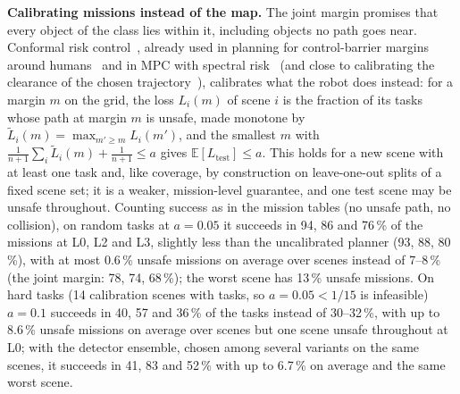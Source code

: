 \documentclass[conference]{IEEEtran}
\theoremstyle{definition}
\begin{document}
\textbf{Calibrating missions instead of the map.} The joint margin promises that every object of the class lies within
it, including objects no path goes near. Conformal risk control~\cite{crc}, already used in planning for control-barrier
margins around humans~\cite{gonzales} and in MPC with spectral risk~\cite{eom} (and close to calibrating the clearance of
the chosen trajectory~\cite{chang}), calibrates what the robot does instead: for a
margin $m$ on the grid, the loss $L_i(m)$ of scene $i$ is the fraction of its tasks whose path at margin $m$ is unsafe,
made monotone by $\tilde L_i(m) = \max_{m' \ge m} L_i(m')$, and the smallest $m$ with
$\frac{1}{n+1}\sum_i \tilde L_i(m) + \frac{1}{n+1} \le a$ gives $\mathbb E[L_{\text{test}}] \le a$. This holds for a new scene with at least one task and, like coverage, by construction on
leave-one-out splits of a fixed scene set; it is a weaker, mission-level guarantee, and one test scene may be unsafe
throughout. Counting success as in the mission tables (no unsafe path, no collision), on random tasks at $a = 0.05$ it
succeeds in 94, 86 and 76\,\% of the missions at L0, L2 and L3, slightly less than the uncalibrated planner (93, 88,
80\,\%), with at most 0.6\,\% unsafe missions on average over scenes instead of 7--8\,\% (the joint margin: 78, 74,
68\,\%); the worst scene has 13\,\% unsafe missions. On hard tasks (14 calibration scenes with tasks, so
$a = 0.05 < 1/15$ is infeasible) $a = 0.1$ succeeds in 40, 57 and 36\,\% of the tasks instead of 30--32\,\%, with up to
8.6\,\% unsafe missions on average over scenes but one scene unsafe throughout at L0; with the detector ensemble, chosen
among several variants on the same scenes, it succeeds in 41, 83 and 52\,\% with up to 6.7\,\% on average and the same
worst scene.
\end{document}
